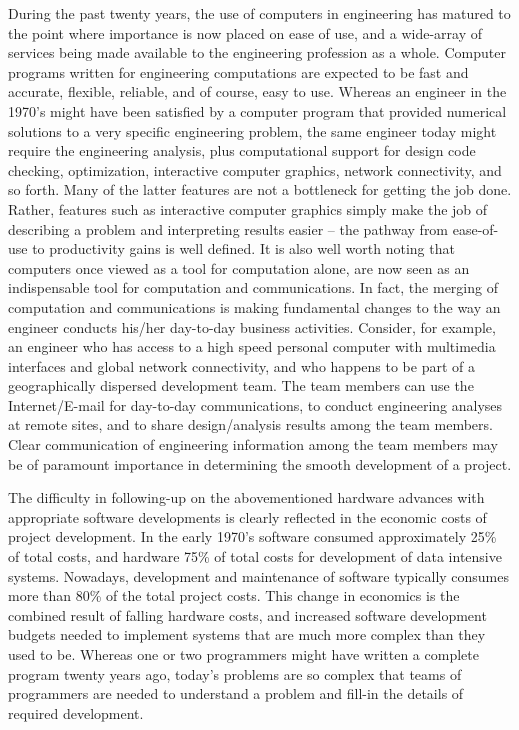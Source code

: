 \vspace{0.15 in}
\noindent\hspace{0.5 in}
During the past twenty years, the use of computers in engineering
has matured to the point where importance is now placed on ease of use,
and a wide-array of services being made available
to the engineering profession as a whole.
Computer programs written for engineering computations
are expected to be fast and accurate, flexible, reliable, and of course, easy to use.
Whereas an engineer in the 1970's might have been satisfied by a
computer program that provided numerical solutions to a very specific engineering problem,
the same engineer today might require the engineering analysis,
plus computational support for design code checking, optimization,
interactive computer graphics, network connectivity, and so forth.
Many of the latter features are not a bottleneck for getting the job done.
Rather, features such as interactive computer graphics simply make the
job of describing a problem and interpreting results easier --
the pathway from ease-of-use to productivity gains is well defined.
It is also well worth noting that computers once viewed as a tool for computation alone,
are now seen as an indispensable tool for computation and communications.
In fact, the merging of computation and communications is making fundamental
changes to the way an engineer conducts his/her day-to-day business activities.
Consider, for example, an engineer who has access to a high speed
personal computer with multimedia interfaces and global network connectivity,
and who happens to be part of a geographically dispersed development team.
The team members can use the Internet/E-mail for day-to-day communications,
to conduct engineering analyses at remote sites,
and to share design/analysis results among the team members.
Clear communication of engineering information among the team members
may be of paramount importance in determining the smooth development of a project.

\vspace{0.15 in}
\noindent\hspace{0.50 in}
The difficulty in following-up on the abovementioned hardware advances with
appropriate software developments is clearly reflected in
the economic costs of project development.
In the early 1970's software consumed approximately 25\% of total costs,
and hardware 75\% of total costs for development of data intensive systems.
Nowadays, development and maintenance of software
typically consumes more than 80\% of the total project costs.
This change in economics is the combined result of falling hardware costs,
and increased software development budgets needed to
implement systems that are much more complex than they used to be.
Whereas one or two programmers might have written a complete program twenty years ago,
today's problems are so complex that teams of programmers are needed
to understand a problem and fill-in the details of required development.

